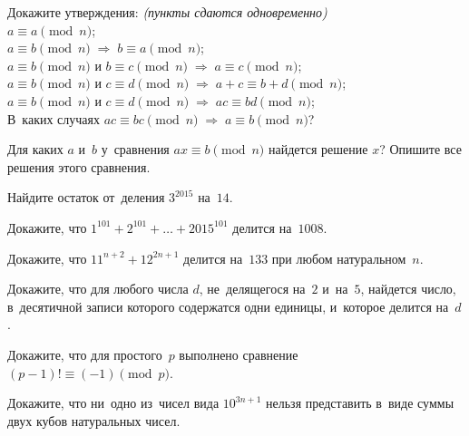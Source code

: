 \begin{problems}

\item
Докажите утверждения: \emph{(пункты сдаются одновременно)}
\\
\subproblem $a \equiv a \pmod n$; %
\\
\subproblem
\(
    a \equiv b \pmod n
\;\Rightarrow\;
    b \equiv a \pmod n
\);
\\
\subproblem
\(
    a \equiv b \pmod n \text{ и } b \equiv c \pmod n
\;\Rightarrow\;
    a \equiv c \pmod n
\);
\\
\subproblem
\(
    a \equiv b \pmod n \text{ и } c \equiv d \pmod n
\;\Rightarrow\;
    a + c \equiv b + d \pmod n
\);
\\
\subproblem
\(
    a \equiv b \pmod n \text{ и } c \equiv d \pmod n
\;\Rightarrow\;
    a c \equiv b d \pmod n
\);
\\
\subproblem
В~каких случаях
\(
    a c \equiv b c \pmod n
\;\Rightarrow\;
    a\equiv b \pmod n
\)?

\item
Для каких $a$ и~$b$ у~сравнения $ax \equiv b \pmod n$ найдется решение $x$?
Опишите все решения этого сравнения.

\item
Найдите остаток от~деления $3^{2015}$ на~$14$.

\item
Докажите, что $1^{101} + 2^{101} + \dots + 2015^{101}$ делится на~$1008$.

\item
Докажите, что $11^{n+2} + 12^{2n + 1}$ делится на~$133$ при любом
натуральном~$n$.

\item
Докажите, что для любого числа $d$, не~делящегося на~$2$ и~на~$5$, найдется
число, в~десятичной записи которого содержатся одни единицы, и~которое
делится на~$d$.

\item{}
Докажите, что для простого~$p$ выполнено сравнение
$(p - 1)! \equiv (-1) \pmod p$.

\item
Докажите, что ни~одно из~чисел вида $10^{3n+1}$ нельзя представить в~виде суммы
двух кубов натуральных чисел.

\end{problems}

